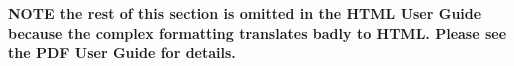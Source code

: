 
{\bf NOTE the rest of this section is omitted in the HTML User
Guide because the complex formatting translates badly to HTML.
Please see the PDF User Guide for details.} 
